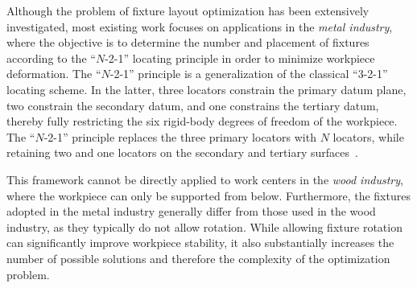 Although the problem of fixture layout optimization has been extensively investigated, most existing work focuses on applications in the \emph{metal industry}, where the objective is to determine the number and placement of fixtures according to the ``$N$-2-1'' locating principle in order to minimize workpiece deformation. The ``$N$-2-1'' principle is a generalization of the classical ``3-2-1'' locating scheme. In the latter, three locators constrain the primary datum plane, two constrain the secondary datum, and one constrains the tertiary datum, thereby fully restricting the six rigid-body degrees of freedom of the workpiece. The ``$N$-2-1'' principle replaces the three primary locators with $N$ locators, while retaining two and one locators on the secondary and tertiary surfaces~\cite{wang2016optimal}.

This framework cannot be directly applied to work centers in the \emph{wood industry}, where the workpiece can only be supported from below. Furthermore, the fixtures adopted in the metal industry generally differ from those used in the wood industry, as they typically do not allow rotation. While allowing fixture rotation can significantly improve workpiece stability, it also substantially increases the number of possible solutions and therefore the complexity of the optimization problem.